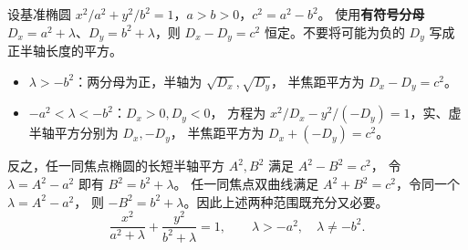 \begin{proofbox}
设基准椭圆 $x^2/a^2+y^2/b^2=1$，$a>b>0$，$c^2=a^2-b^2$。
使用\textbf{有符号分母} $D_x=a^2+\lambda$、$D_y=b^2+\lambda$，则
$D_x-D_y=c^2$ 恒定。不要将可能为负的 $D_y$ 写成正半轴长度的平方。
\begin{itemize}
\item $\lambda>-b^2$：两分母为正，半轴为 $\sqrt{D_x},\sqrt{D_y}$，
半焦距平方为 $D_x-D_y=c^2$。
\item $-a^2<\lambda<-b^2$：$D_x>0,D_y<0$，
方程为 $x^2/D_x-y^2/(-D_y)=1$，实、虚半轴平方分别为 $D_x,-D_y$，
半焦距平方为 $D_x+(-D_y)=c^2$。
\end{itemize}
反之，任一同焦点椭圆的长短半轴平方 $A^2,B^2$ 满足 $A^2-B^2=c^2$，
令 $\lambda=A^2-a^2$ 即有 $B^2=b^2+\lambda$。
任一同焦点双曲线满足 $A^2+B^2=c^2$，令同一个 $\lambda=A^2-a^2$，
则 $-B^2=b^2+\lambda$。因此上述两种范围既充分又必要。
\[
\boxed{\frac{x^2}{a^2+\lambda}+\frac{y^2}{b^2+\lambda}=1},\qquad
\lambda>-a^2,\quad\lambda\ne-b^2.
\]
\end{proofbox}
